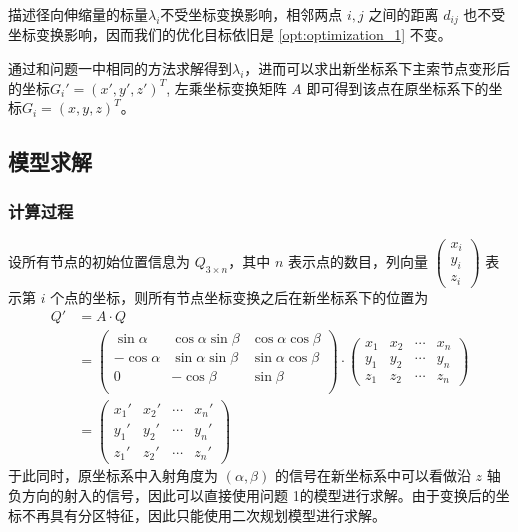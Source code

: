 \documentclass[withoutpreface,bwprint,fontset=macnew]{cumcmthesis} %
\begin{document}
		描述径向伸缩量的标量$\lambda_i$不受坐标变换影响，相邻两点 $i,j$ 之间的距离 $d_{ij}$ 也不受坐标变换影响，因而我们的优化目标依旧是 \ref{opt:optimization_1} 不变。
		
	
	通过和问题一中相同的方法求解得到$\lambda_i$，进而可以求出新坐标系下主索节点变形后的坐标$G_i' = (x', y', z')^T$, 左乘坐标变换矩阵 $A$ 即可得到该点在原坐标系下的坐标$G_i = (x, y, z)^T$。
	
	\subsection {模型求解}
	\subsubsection {计算过程}
		设所有节点的初始位置信息为 $Q_{3\times n}$，其中 $n$ 表示点的数目，列向量 $\begin{pmatrix}x_i\\y_i\\z_i\end{pmatrix}$ 表示第 $i$ 个点的坐标，则所有节点坐标变换之后在新坐标系下的位置为
		\begin{align*}
		Q' &= A\cdot Q \\
		   &= \begin{pmatrix}
						    \sin\alpha & \cos\alpha\sin\beta & \cos\alpha\cos\beta \\
						    -\cos\alpha & \sin\alpha\sin\beta & \sin\alpha\cos\beta \\
						    0 & -\cos\beta & \sin\beta \\
						\end{pmatrix} \cdot
			\begin{pmatrix}
			x_1 & x_2 & \cdots & x_n\\
			y_1 & y_2 & \cdots & y_n\\
			z_1 & z_2 & \cdots & z_n
			\end {pmatrix}\\
			&= \begin{pmatrix}
			x_1' & x_2' & \cdots & x_n'\\
			y_1' & y_2' & \cdots & y_n'\\
			z_1' & z_2' & \cdots & z_n'
			\end {pmatrix}
		\end{align*}
		于此同时，原坐标系中入射角度为 $(\alpha, \beta)$ 的信号在新坐标系中可以看做沿 $z$ 轴负方向的射入的信号，因此可以直接使用问题 1的模型进行求解。由于变换后的坐标不再具有分区特征，因此只能使用二次规划模型进行求解。
		
\end{document}
